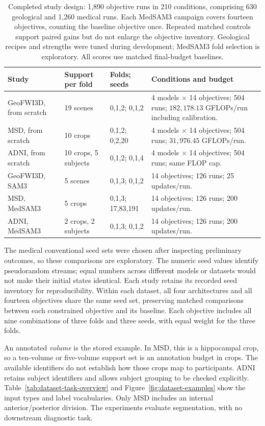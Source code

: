 \documentclass[12pt,a4paper]{article}
\begin{document}
\begin{table}[htbp]
\centering\small{}
\begin{tabular}{@{}P{2.5cm}P{3.0cm}P{3.2cm}P{5.7cm}@{}}
\hline
Study & Support per fold & Folds; seeds & Conditions and budget \\
\hline
GeoFWI3D, from scratch & 19 scenes & 0,1,2; 0,1,2 & 4 models $\times$ 14 objectives; 504 runs; $182{,}178.13$ GFLOPs/run including calibration. \\[.5em]
MSD, from scratch & 10 crops & 0,1,2; 0,2,20 & 4 models $\times$ 14 objectives; 504 runs; $31{,}976.45$ GFLOPs/run. \\[.5em]
ADNI, from scratch & 10 crops, 5 subjects & 0,1,2; 0,1,4 & 4 models $\times$ 14 objectives; 504 runs; same FLOP cap. \\[.5em]
GeoFWI3D, SAM3 & 5 scenes & 0,1,3; 0,1,2 & 14 objectives; 126 runs; 25 updates/run. \\[.5em]
MSD, MedSAM3 & 5 crops & 0,1,3; 17,83,191 & 14 objectives; 126 runs; 200 updates/run. \\[.5em]
ADNI, MedSAM3 & 2 crops, 2 subjects & 0,1,3; 0,1,2 & 14 objectives; 126 runs; 200 updates/run. \\
\hline
\end{tabular}
\caption{Completed study design: 1,890 objective runs in 210 conditions,
comprising 630 geological and 1,260 medical runs.
Each MedSAM3 campaign covers fourteen objectives, counting the baseline
objective once. Repeated matched controls support paired gains but do
not enlarge the objective inventory.
Geological recipes and strengths were tuned during development;
MedSAM3 fold selection is exploratory.
All scores use matched final-budget baselines.}
\label{tab:experimental-design}
\end{table}

The medical conventional seed sets were chosen after inspecting
preliminary outcomes, so these comparisons are exploratory.
The numeric seed values identify pseudorandom streams; equal numbers
across different models or datasets would not make their initial states
identical. Each study retains its recorded seed inventory for reproducibility.
Within each dataset, all four architectures and all fourteen objectives
share the same seed set,
preserving matched comparisons between each constrained objective and
its baseline. Each objective includes all nine combinations of three
folds and three seeds, with equal weight for the three folds.

An annotated \emph{volume} is the stored example. In MSD, this is a
hippocampal crop, so a ten-volume or five-volume support set is an
annotation budget in crops. The available identifiers do not establish
how those crops map to participants. ADNI retains subject identifiers
and allows subject grouping to be checked explicitly.
Table~\ref{tab:dataset-task-overview} and
Figure~\ref{fig:dataset-examples} show the input types and label
vocabularies. Only MSD includes an internal anterior/posterior division.
The experiments evaluate segmentation, with no downstream diagnostic task.
\end{document}
